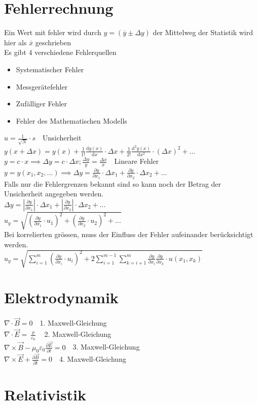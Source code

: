 \documentclass[8pt,a4paper]{extarticle}
\newcommand{\frml}[2]{$#1$~\hfill~#2\\}
\newcommand{\pder}[2]{\frac{\partial#1}{\partial#2}}
\newcommand{\tder}[2]{\frac{\mathrm d #1}{\mathrm d #2}}
\begin{document}
\begin{multicols}{3}
\section{Fehlerrechnung}
Ein Wert mit fehler wird durch $y = (\overline{y}\pm\Delta y)$ der Mittelweg der Statistik wird hier als $\overline{x}$ geschrieben\\
Es gibt 4 verschiedene Fehlerquellen\\
\begin{itemize}
	\item Systematischer Fehler
	\item Messger\"atefehler
	\item Zuf\"alliger Fehler
	\item Fehler des Mathematischen Modells
\end{itemize}
\frml{u = \frac{1}{\sqrt{N}}\cdot s}{Unsicherheit}
\frml{y(x+ \Delta x)= y(x)+\frac{1}{1!}\tder{y(x)}{x}\cdot\Delta x+\frac{1}{2!}\tder{^2y(x)}{x^2}\cdot(\Delta x)^2+...}{}
\frml{y = c\cdot x \implies \Delta y = c \cdot \Delta x ; \frac{\Delta y}{y} = \frac{\Delta x}{x}}{Lineare Fehler}
\frml{y = y(x_1,x_2,...)\implies \Delta y = \pder{y}{x_1}\cdot\Delta x_1 + \pder{y}{x_2}\cdot\Delta x_2+...}{}
Falls nur die Fehlergrenzen bekannt sind so kann noch der Betrag der Unsicherheit angegeben werden.\\
\frml{\Delta y = \left|\pder{y}{x_1}\right|\cdot \Delta x_1+\left|\pder{y}{x_2}\right|\cdot \Delta x_2 + ...}{}
\frml{ u_y=\sqrt{\left(\pder{y}{x_1}\cdot u_1\right)^2+\left(\pder{y}{x_2}\cdot u_2\right)^2+...}}{}
Bei korrelierten gr\"ossen, muss der Einfluss der Fehler aufeinander ber\"ucksichtigt werden.\\
\frml{u_y = \sqrt{\sum_{i=1}^m(\pder{y}{x_i}\cdot u_i)^2+2\sum_{i=1}^{m-1}\sum_{k=i+1}^{m}\pder{y}{x_i}\pder{y}{x_k}\cdot u(x_1,x_k)}}{}
\section{Elektrodynamik}
\frml{\nabla\cdot\vec{B}=0}{1. Maxwell-Gleichung}
\frml{\nabla\cdot\vec{E}=\frac{\varrho}{\varepsilon_0}}{2. Maxwell-Gleichung}
\frml{\nabla\times\vec{B}-\mu_0\varepsilon_0\pder{\vec{E}}{t} =0}{3. Maxwell-Gleichung}
\frml{\nabla\times\vec{E}+\pder{\vec{B}}{t}=0}{4. Maxwell-Gleichung}
\section{Relativistik}

\end{multicols}
\end{document}
